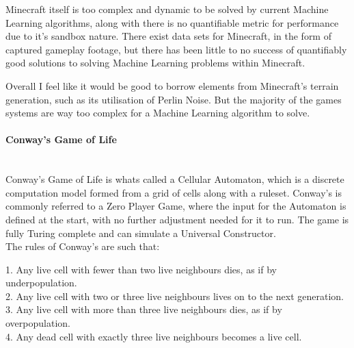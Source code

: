 \begin{flushleft}
                    Minecraft itself is too complex and dynamic to be solved by current Machine Learning algorithms, along with there is no quantifiable 
                    metric for performance due to it's sandbox nature. There exist data sets for Minecraft, in the form of captured gameplay footage, but
                    there has been little to no success of quantifiably good solutions to solving Machine Learning problems within Minecraft. \\

                    \vspace{0.2cm}

                    Overall I feel like it would be good to borrow elements from Minecraft's terrain generation, such as its utilisation of Perlin Noise.
                    But the majority of the games systems are way too complex for a Machine Learning algorithm to solve. \\

                \paragraph{Conway's Game of Life} \mbox{} \\
                    \vspace{0.2cm}
                    Conway's Game of Life is whats called a Cellular Automaton, which is a discrete computation model formed from a grid of cells along with 
                    a ruleset. Conway's is commonly referred to a Zero Player Game, where the input for the Automaton is defined at the start, with no
                    further adjustment needed for it to run. The game is fully Turing complete and can simulate a Universal Constructor. \\
                    \vspace{0.2cm}
                    The rules of Conway's are such that: \\

                    \vspace{0.2cm}
                    \begin{addmargin}[2em]{0em}
                        \large
                        1. Any live cell with fewer than two live neighbours dies, as if by underpopulation. \\
                        2. Any live cell with two or three live neighbours lives on to the next generation. \\
                        3. Any live cell with more than three live neighbours dies, as if by overpopulation. \\
                        4. Any dead cell with exactly three live neighbours becomes a live cell. \\
                    \end{addmargin}


\end{flushleft}

